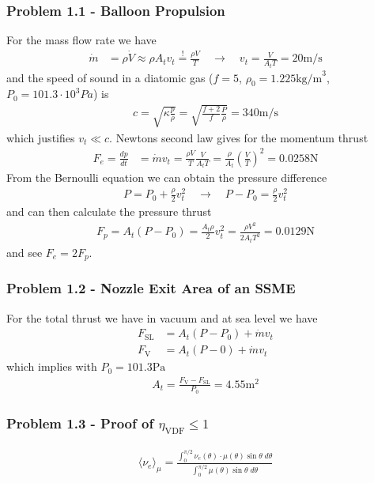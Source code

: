 \documentclass[10pt,a4paper]{article}
\theoremstyle{definition}
\begin{document}
\subsubsection{Problem 1.1 - Balloon Propulsion}
For the mass flow rate we have
\begin{align}
    \dot{m}&=\rho\dot{V}\approx\rho A_t v_t \stackrel{!}{=} \frac{\rho V}{T}\quad\rightarrow\quad v_t=\frac{V}{A_tT}=20\text{m/s}
\end{align}
and the speed of sound in a diatomic gas ($f=5$, $\rho_0=1.225\text{kg/m}^3$, $P_0=101.3\cdot10^3Pa$) is
\begin{align}
    c=\sqrt{\kappa\frac{p}{\rho}}=\sqrt{\frac{f+2}{f}\frac{P}{\rho}}=340\text{m/s}
\end{align}
which justifies $v_t\ll c$. Newtons second law gives for the momentum thrust
\begin{align}
    F_e=\frac{dp}{dt}&=\dot{m}v_t=\frac{\rho V}{T}\frac{V}{A_t T}=\frac{\rho}{A_t}\left(\frac{V}{T}\right)^2=0.0258\text{N}
\end{align}
From the Bernoulli equation we can obtain the pressure difference
\begin{align}
    P = P_0+\frac{\rho}{2}v_t^2\quad\rightarrow\quad P - P_0=\frac{\rho}{2}v_t^2
\end{align}
and can then calculate the pressure thrust
\begin{align}
    F_p=A_t(P-P_0)=\frac{A_t\rho}{2}v_t^2=\frac{\rho V^2}{2A_tT^2}=0.0129\text{N}
\end{align}
and see $F_e=2F_p$.


\subsubsection{Problem 1.2 - Nozzle Exit Area of an SSME}
For the total thrust we have in vacuum and at sea level we have
\begin{align}
    F_\text{SL}&=A_t(P-P_0) + \dot{m}v_t\\
    F_\text{V}&=A_t(P-0) + \dot{m}v_t
\end{align}
which implies with $P_0=101.3\text{Pa}$
\begin{align}
    A_t=\frac{F_\text{V}-F_\text{SL}}{P_0}=4.55\text{m}^2
\end{align}


\subsubsection{Problem 1.3 - Proof of \texorpdfstring{$\eta_\text{VDF}\le1$}{Lg} }
\begin{align}
    \langle \nu_e\rangle_\mu=\frac{\int_0^{\pi/2}\nu_e(\theta)\cdot\mu(\theta)\sin\theta\;d\theta}{\int_0^{\pi/2}\mu(\theta)\sin\theta\;d\theta}
\end{align}
\end{document}
